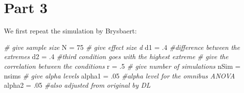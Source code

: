 \documentclass[]{book}
\newenvironment{Shaded}{\begin{snugshade}}{\end{snugshade}}
\newcommand{\CommentTok}[1]{\textcolor[rgb]{0.56,0.35,0.01}{\textit{#1}}}
\newcommand{\DecValTok}[1]{\textcolor[rgb]{0.00,0.00,0.81}{#1}}
\newcommand{\FloatTok}[1]{\textcolor[rgb]{0.00,0.00,0.81}{#1}}
\newcommand{\NormalTok}[1]{#1}
\newcommand{\StringTok}[1]{\textcolor[rgb]{0.31,0.60,0.02}{#1}}
\begin{document}
\hypertarget{part-3-1}{%
\section{Part 3}\label{part-3-1}}

We first repeat the simulation by Brysbaert:

\begin{Shaded}
\begin{Highlighting}[]
\CommentTok{# give sample size}
\NormalTok{N =}\StringTok{ }\DecValTok{75}
\CommentTok{# give effect size d}
\NormalTok{d1 =}\StringTok{ }\FloatTok{.4} \CommentTok{#difference between the extremes}
\NormalTok{d2 =}\StringTok{ }\FloatTok{.4} \CommentTok{#third condition goes with the highest extreme}
\CommentTok{# give the correlation between the conditions}
\NormalTok{r =}\StringTok{ }\FloatTok{.5}
\CommentTok{# give number of simulations}
\NormalTok{nSim =}\StringTok{ }\NormalTok{nsims}
\CommentTok{# give alpha levels}
\NormalTok{alpha1 =}\StringTok{ }\FloatTok{.05} \CommentTok{#alpha level for the omnibus ANOVA}
\NormalTok{alpha2 =}\StringTok{ }\FloatTok{.05} \CommentTok{#also adjusted from original by DL}
\end{Highlighting}
\end{Shaded}
\end{document}
